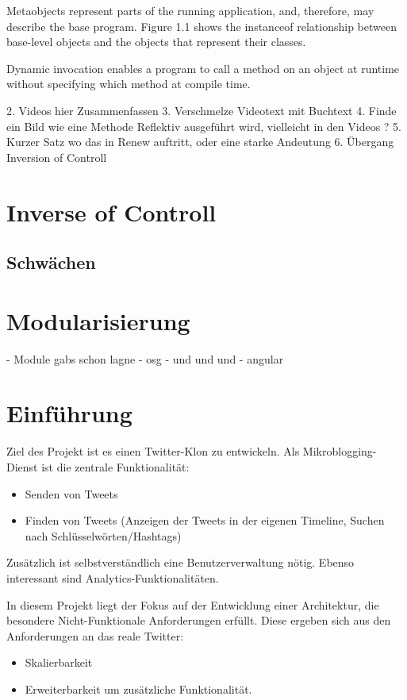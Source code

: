 Metaobjects represent parts of the running application, and, therefore, may describe the base program. Figure 1.1 shows the instanceof relationship between base-level objects and the objects that represent their classes. 

Dynamic invocation enables a program to call a method on an object at runtime without specifying which method at compile time.

 2. Videos hier Zusammenfassen 
 3. Verschmelze Videotext mit Buchtext 
 4. Finde ein Bild wie eine Methode Reflektiv ausgeführt wird, vielleicht in den Videos ? 
 5. Kurzer Satz wo das in Renew auftritt, oder eine starke Andeutung 
 6. Übergang Inversion of Controll 

\section{Inverse of Controll}
\label{sec:inverse_of_controll}

\subsection{Schwächen} %
\label{sub:schwächen}

\section{Modularisierung}
\label{sec:modularisierung}
- Module gabs schon lagne 
- osg 
- und und und 
- angular 


\section{Einführung}
Ziel des Projekt ist es einen Twitter-Klon zu entwickeln. Als Mikroblogging-Dienst ist die zentrale Funktionalität:
\begin{itemize}
  \item Senden von Tweets
  \item Finden von Tweets (Anzeigen der Tweets in der eigenen Timeline, Suchen nach Schlüsselwörten/Hashtags)
\end{itemize}
Zusätzlich ist selbstverständlich eine Benutzerverwaltung nötig. Ebenso interessant sind Analytics-Funktionalitäten.

In diesem Projekt liegt der Fokus auf der Entwicklung  einer Architektur, die besondere Nicht-Funktionale Anforderungen
erfüllt. Diese ergeben sich aus den Anforderungen an das reale Twitter:
\begin{itemize}
  \item Skalierbarkeit
  \item Erweiterbarkeit um zusätzliche Funktionalität.
\end{itemize}

